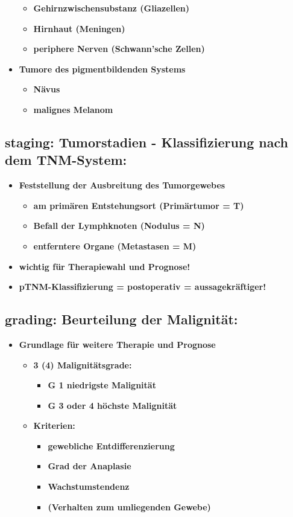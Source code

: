 \begin{itemize}
				\begin{itemize}
					\item \textbf{Gehirnzwischensubstanz (Gliazellen)}
					\item \textbf{Hirnhaut (Meningen)}
					\item \textbf{periphere Nerven (Schwann'sche Zellen)}
				\end{itemize}
			\item \textbf{Tumore des pigmentbildenden Systems}
				\begin{itemize}
					\item \textbf{Nävus}
					\item \textbf{malignes Melanom}
				\end{itemize}
		\end{itemize}
	\subsection{staging: Tumorstadien - Klassifizierung nach dem TNM-System:}
		\begin{itemize}
			\item \textbf{Feststellung der Ausbreitung des Tumorgewebes}
						\begin{itemize}
							\item \textbf{am primären Entstehungsort (Primärtumor = T)}
							\item \textbf{Befall der Lymphknoten (Nodulus = N)}
							\item \textbf{entferntere Organe (Metastasen = M)}
						\end{itemize}
			\item \textbf{wichtig für Therapiewahl und Prognose!}
			\item \textbf{pTNM-Klassifizierung = postoperativ = aussagekräftiger!}
		\end{itemize}
	\subsection{grading: Beurteilung der Malignität:}
		\begin{itemize}
			\item \textbf{Grundlage für weitere Therapie und Prognose}
				\begin{itemize}
					\item \textbf{3 (4) Malignitätsgrade:}
						\begin{itemize}
							\item \textbf{G 1 niedrigste Malignität}
							\item \textbf{G 3 oder 4  höchste Malignität}
						\end{itemize}
					\item \textbf{Kriterien:}
						\begin{itemize}
							\item \textbf{gewebliche Entdifferenzierung}
							\item \textbf{Grad der Anaplasie}
							\item \textbf{Wachstumstendenz}
							\item \textbf{(Verhalten zum umliegenden Gewebe)}
						\end{itemize}
				\end{itemize}
		\end{itemize}
